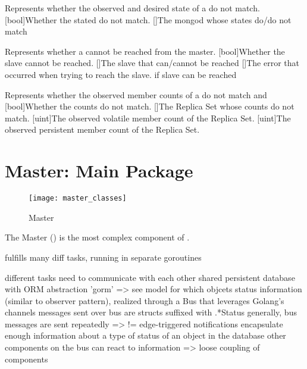 {
  Represents whether the observed and desired state of a  do not match.
}{
  [bool]{Whether the stated do not match.}
  []{The mongod whose states do/do not match}
}

{
  Represents whether a  cannot be reached from the master.
}{
  [bool]{Whether the slave cannot be reached.}
  []{The slave that can/cannot be reached}
  []{The error that occurred when trying to reach the slave.  if slave can be reached}
}

{
  Represents whether the observed member counts of a  do not match  and 
}{
  [bool]{Whether the counts do not match.}
  []{The Replica Set whose counts do not match.}
  [uint]{The observed volatile member count of the Replica Set.}
  [uint]{The observed persistent member count of the Replica Set.}
}


\section{Master: Main Package}
\renewcommand{\gocurpackage}{master}

\begin{figure}[H]
	\texttt{[image: master\_classes]}
	\caption{Master}
\end{figure}

The Master () is the most complex component of \mamid.

fulfills many diff tasks, running in separate goroutines

different tasks need to communicate with each other
  shared persistent database with ORM abstraction 'gorm' => see model for which objcets
  status information (similar to observer pattern), realized through a Bus that leverages Golang's channels
    messages sent over bus are structs suffixed with .*Status
    generally, bus messages are sent repeatedly => != edge-triggered notifications
    encapsulate enough information about a type of status of an object in the database
      other components on the bus can react to information
=> loose coupling of components

